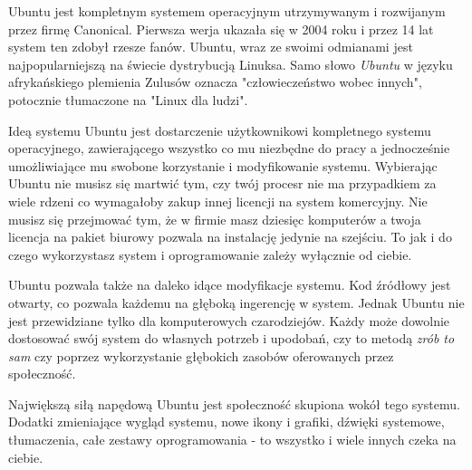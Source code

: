 Ubuntu jest kompletnym systemem operacyjnym utrzymywanym i rozwijanym przez firmę Canonical. Pierwsza werja ukazała się w 2004 roku i przez 14 lat system ten zdobył rzesze fanów. Ubuntu, wraz ze swoimi odmianami jest najpopularniejszą na świecie dystrybucją Linuksa. Samo słowo \emph{Ubuntu} w języku afrykańskiego plemienia Zulusów oznacza "człowieczeństwo wobec innych", potocznie tłumaczone na "Linux dla ludzi".

Ideą systemu Ubuntu jest dostarczenie użytkownikowi kompletnego systemu operacyjnego, zawierającego wszystko co mu niezbędne do pracy a jednocześnie umożliwiające mu swobone korzystanie i modyfikowanie systemu. Wybierając Ubuntu nie musisz się martwić tym, czy twój procesr nie ma przypadkiem za wiele rdzeni co wymagałoby zakup innej licencji na system komercyjny. Nie musisz się przejmować tym, że w firmie masz dziesięc komputerów a twoja licencja na pakiet biurowy pozwala na instalację jedynie na szejściu. To jak i do czego wykorzystasz system i oprogramowanie zależy wyłącznie od ciebie.

Ubuntu pozwala także na daleko idące modyfikacje systemu. Kod źródłowy jest otwarty, co pozwala każdemu na głęboką ingerencję w system. Jednak Ubuntu nie jest przewidziane tylko dla komputerowych czarodziejów. Każdy może dowolnie dostosować swój system do własnych potrzeb i upodobań, czy to metodą \emph{zrób to sam} czy poprzez wykorzystanie głębokich zasobów oferowanych przez społeczność.

Największą siłą napędową Ubuntu jest społeczność skupiona wokół tego systemu. Dodatki zmieniające wygląd systemu, nowe ikony i grafiki, dźwięki systemowe, tłumaczenia, całe zestawy oprogramowania - to wszystko i wiele innych czeka na ciebie.
